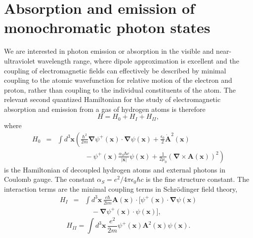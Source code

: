 \documentclass[final,3p,12pt]{elsarticle3}
\begin{document}
\section{Absorption and emission of monochromatic photon states}
\label{sec:mono}

We are interested in photon emission or absorption in the visible and near-ultraviolet
wavelength range, where dipole approximation is excellent and the coupling of 
electromagnetic fields can effectively be described by minimal coupling to the atomic 
wavefunction for relative motion of the electron and proton, rather than coupling to the 
individual constituents of the atom.
The relevant second quantized Hamiltonian for the study of electromagnetic
absorption and emission from a gas of hydrogen atoms is therefore
\begin{equation}\label{eq:Hegamma}
H=H_0+H_I+H_{II},
\end{equation}
where 
\begin{eqnarray*}
H_0&=&\int\!d^3\bm{x}\left(
\frac{\hbar^2}{2m}\bm{\nabla}\psi^+(\bm{x})\cdot\!\bm{\nabla}\psi(\bm{x})
+\frac{\epsilon_0}{2}\dot{\bm{A}}^2(\bm{x})
\right.
\\
&&
\qquad\qquad-\left.\psi^+(\bm{x})\frac{\alpha_S\hbar c}{|\bm{x}|}\psi(\bm{x})
+\frac{1}{2\mu_0}\left(\bm{\nabla}\times\bm{A}(\bm{x})\right)^2\right)
\end{eqnarray*}
is the Hamiltonian of decoupled hydrogen atoms and external photons
in Coulomb gauge. The constant $\alpha_S=e^2/4\pi\epsilon_0\hbar c$ is 
the fine structure constant.
The interaction terms are the minimal coupling terms
in Schr\"odinger field theory,
\begin{eqnarray} \nonumber
H_I&=&\int\!d^3\bm{x}\,
\frac{e\hbar}{2\mathrm{i}m}\bm{A}(\bm{x})\cdot
[\psi^+(\bm{x})\cdot\bm{\nabla}\psi(\bm{x})
\\ \label{eq:H1}
&&
\quad -\bm{\nabla}\psi^+(\bm{x})\cdot\psi(\bm{x})],
\end{eqnarray}
\begin{equation}\label{eq:H2}
H_{II}=\int\!d^3\bm{x}\,\frac{e^2}{2m}\psi^+(\bm{x})
\bm{A}^2(\bm{x})\psi(\bm{x}).
\end{equation}
\end{document}
